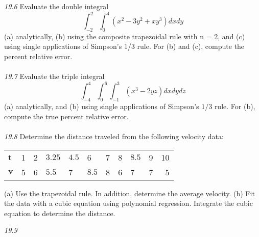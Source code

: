 \documentclass[../main.tex]{subfiles}
\begin{document}
\noindent\textit{19.6} Evaluate the double integral
$$\int_{-2}^{2} \int_{0}^{4}\left(x^{2}-3 y^{2}+x y^{3}\right) d x d y$$
(a) analytically, (b) using the composite trapezoidal rule
with n = 2, and (c) using single applications of Simpson's
1/3 rule. For (b) and (c), compute the percent relative error.\\
\\\noindent\textit{19.7} Evaluate the triple integral
$$
\int_{-4}^{4} \int_{0}^{6} \int_{-1}^{3}\left(x^{3}-2 y z\right) d x d y d z
$$
(a) analytically, and (b) using single applications of Simpson's $1 / 3$ rule. For (b), compute the true percent relative error.\\
\\\noindent\textit{19.8} Determine the distance traveled from the following velocity data:

\begin{center}
\begin{tabular}{llllllllllr}
\hline $\boldsymbol{t}$ & 1 & 2 & $3.25$ & $4.5$ & 6 & 7 & 8 & $8.5$ & 9 & 10 \\
$\boldsymbol{v}$ & 5 & 6 & $5.5$ & 7 & $8.5$ & 8 & 6 & 7 & 7 & 5 \\
\hline
\end{tabular}
\end{center}

(a) Use the trapezoidal rule. In addition, determine the average velocity.
(b) Fit the data with a cubic equation using polynomial
regression. Integrate the cubic equation to determine the
distance.

\noindent\textit{19.9}
\end{document}
